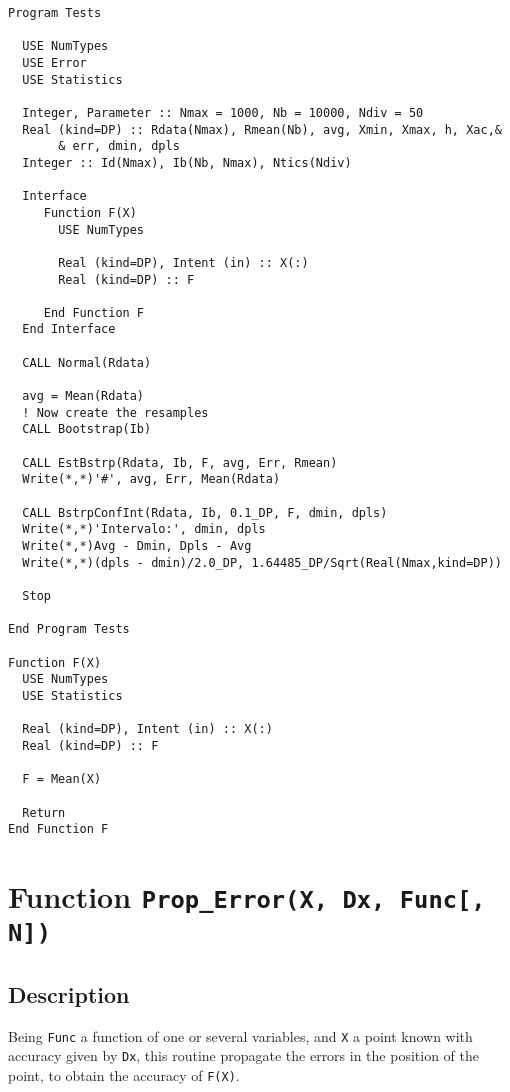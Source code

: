 \begin{lstlisting}[emph=BstrpConfInt,
                   emphstyle=\color{blue},
                   frame=trBL,
                   caption=Giving a confidence interval.,
                   label=BstrpConfInt]
Program Tests

  USE NumTypes
  USE Error
  USE Statistics

  Integer, Parameter :: Nmax = 1000, Nb = 10000, Ndiv = 50
  Real (kind=DP) :: Rdata(Nmax), Rmean(Nb), avg, Xmin, Xmax, h, Xac,&
       & err, dmin, dpls
  Integer :: Id(Nmax), Ib(Nb, Nmax), Ntics(Ndiv)

  Interface 
     Function F(X)
       USE NumTypes
         
       Real (kind=DP), Intent (in) :: X(:)
       Real (kind=DP) :: F
       
     End Function F
  End Interface
  
  CALL Normal(Rdata)

  avg = Mean(Rdata)
  ! Now create the resamples
  CALL Bootstrap(Ib)

  CALL EstBstrp(Rdata, Ib, F, avg, Err, Rmean)
  Write(*,*)'#', avg, Err, Mean(Rdata)

  CALL BstrpConfInt(Rdata, Ib, 0.1_DP, F, dmin, dpls)
  Write(*,*)'Intervalo:', dmin, dpls
  Write(*,*)Avg - Dmin, Dpls - Avg
  Write(*,*)(dpls - dmin)/2.0_DP, 1.64485_DP/Sqrt(Real(Nmax,kind=DP))

  Stop

End Program Tests

Function F(X)
  USE NumTypes
  USE Statistics
  
  Real (kind=DP), Intent (in) :: X(:)
  Real (kind=DP) :: F

  F = Mean(X)
  
  Return
End Function F
\end{lstlisting}

\section{Function \texttt{Prop\_Error(X, Dx, Func[, N])}}

\subsection{Description}

Being \texttt{Func} a function of one or several variables, and \texttt{X} a point
known 
with accuracy given by \texttt{Dx}, this routine propagate the errors
in the position of the point, to obtain the accuracy of \texttt{F(X)}.


